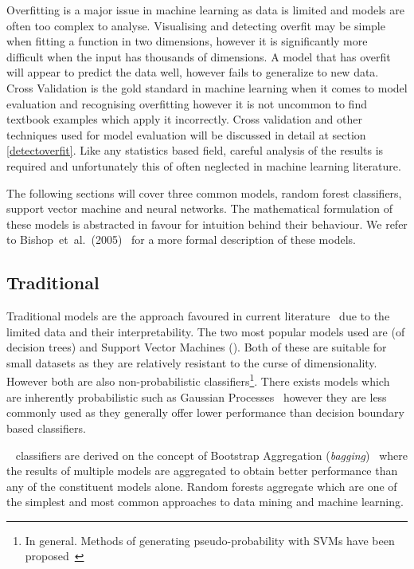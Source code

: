\documentclass[12pt, twoside]{book}
\renewcommand\emph[1]{\textit{\color{USred}{#1}}}
\begin{document}
Overfitting is a major issue in machine learning as data is limited and models are often too complex to analyse. Visualising and detecting overfit may be simple when fitting a function in two dimensions, however it is significantly more difficult when the input has thousands of dimensions. A model that has overfit will appear to predict the data well, however fails to generalize to new data. Cross Validation is the gold standard in machine learning when it comes to model evaluation and recognising overfitting however it is not uncommon to find textbook examples which apply it incorrectly. Cross validation and other techniques used for model evaluation will be discussed in detail at section \ref{detectoverfit}. Like any statistics based field, careful analysis of the results is required and unfortunately this of often neglected in machine learning literature.


The following sections will cover three common models, random forest classifiers, support vector machine and neural networks. The mathematical formulation of these models is abstracted in favour for intuition behind their behaviour. We refer to Bishop~et~al.~(2005)~\cite{prml} for a more formal description of these models.

 
\subsection{Traditional}
\label{traditionalmodels}
Traditional models are the approach favoured in current literature~\cite{review2013} due to the limited data and their interpretability. The two most popular models used are \emph{Random Forests} (of decision trees) and Support Vector Machines (\emph{SVM}). Both of these are suitable for small datasets as they are relatively resistant to the curse of dimensionality. However both are also non-probabilistic classifiers\footnote{In general. Methods of generating pseudo-probability with SVMs have been proposed~\cite{svmprobabilistic}}. There exists models which are inherently probabilistic such as Gaussian Processes~\cite{rasmussen2006gaussian} however they are less commonly used as they generally offer lower performance than decision boundary based classifiers.

\emph{Random Forest}~\cite{randomforests} classifiers are derived on the concept of Bootstrap Aggregation  (\textit{bagging})~\cite{bagging} where the results of multiple models are aggregated to obtain better performance than any of the constituent models alone. Random forests aggregate \emph{Decision Trees} which are one of the simplest and most common approaches to data mining and machine learning. 
\end{document}
